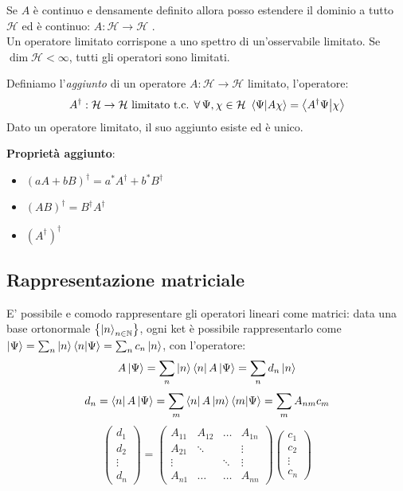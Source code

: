 Se \(A\) è continuo e densamente definito allora posso estendere il dominio a tutto \(\mathcal{H}\) ed è continuo: \(A : \mathcal{H}\to \mathcal{H}\) . \\
Un operatore limitato corrispone a uno spettro di un'osservabile limitato.
Se \(\operatorname{dim}\mathcal{H} < \infty\), tutti gli operatori sono limitati. 

\begin{definition}
    Definiamo l'\textit{aggiunto} di un operatore \(A: \mathcal{H}\to \mathcal{H}\) limitato, l'operatore:
    \begin{equation}
        A^\dagger: \mathcal{H}\to \mathcal{H} \text{ limitato t.c. } 
        \forall \,\Psi, \chi \in \mathcal{H}\ \braket{\Psi}{A\chi} = \braket{A^\dagger\Psi}{\chi}
    \end{equation}
    Dato un operatore limitato, il suo aggiunto esiste ed è unico.
\end{definition}

\textbf{Proprietà aggiunto}:
\begin{itemize}
    \item \((aA+ bB)^\dagger= a^*A^\dagger + b^*B^\dagger \)
    \item \((AB)^\dagger= B^\dagger A^\dagger\)
    \item \((A^\dagger)^\dagger\)
\end{itemize}


\subsection{Rappresentazione matriciale}
E' possibile e comodo rappresentare gli operatori lineari come matrici:
data una base ortonormale \(\left\{ \ket{n}_{n \in \mathbb{N}} \right\}\),
ogni ket è possibile rappresentarlo come \(\ket{\Psi}= \sum_n \ket{n}\braket{n}{\Psi}= \sum_n c_n \ket{n}\), con l'operatore:
\[
    A\ket{\Psi}= \sum_n \ket{n} \bra{n}A\ket{\Psi}= \sum_n d_n \ket{n}
\]
\[
    d_n= \bra{n}A\ket{\Psi} = \sum_m \bra{n} A \ket{m}\bra{m}\ket{\Psi}= \sum_m A_{nm}c_m 
\]
\[
    \begin{pmatrix}
        d_1\\d_2\\ \vdots\\d_n
    \end{pmatrix}= 
    \begin{pmatrix}
        A_{11} & A_{12} & \dots & A_{1n} \\
        A_{21} & \ddots & &\vdots\\
        \vdots& &\ddots & \vdots \\
        A_{n1} & \dots & \dots & A_{nn}
    \end{pmatrix}
    \begin{pmatrix}
        c_1 \\
        c_2\\
        \vdots\\
        c_n 
    \end{pmatrix}
\]

